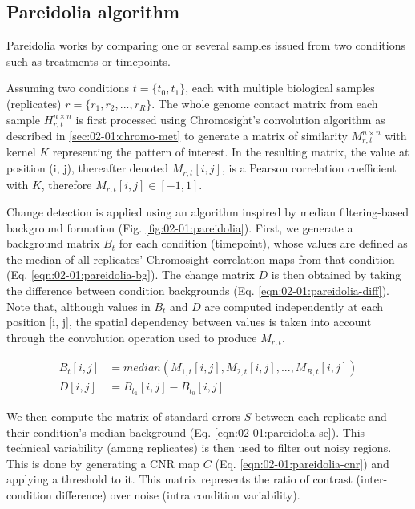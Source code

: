 \subsection{Pareidolia algorithm}

Pareidolia works by comparing one or several samples issued from two conditions such as treatments or timepoints.


Assuming two conditions $t=\{t_0, t_1\}$, each with multiple biological samples (replicates) $r=\{r_1, r_2, ..., r_R\}$. The whole genome contact matrix from each sample $H_{r, t}^{n \times n}$ is first processed using Chromosight's convolution algorithm as described in \ref{sec:02-01:chromo-met} to generate a matrix of similarity $M_{r, t}^{n \times n}$ with kernel $K$ representing the pattern of interest. In the resulting matrix, the value at position (i, j), thereafter denoted $M_{r, t}[i, j]$, is a Pearson correlation coefficient with $K$, therefore $M_{r,t}[i, j] \in [-1, 1]$.

Change detection is applied using an algorithm inspired by median filtering-based background formation \cite{ilseverTwoDimensionalChangeDetection2012} (Fig. \ref{fig:02-01:pareidolia}). First, we generate a background matrix $B_t$ for each condition (timepoint), whose values are defined as the median of all replicates' Chromosight correlation maps from that condition (Eq. \ref{eqn:02-01:pareidolia-bg}). The change matrix $D$ is then obtained by taking the difference between condition backgrounds (Eq. \ref{eqn:02-01:pareidolia-diff}). Note that, although values in $B_t$ and $D$ are computed independently at each position [i, j], the spatial dependency between values is taken into account through the convolution operation used to produce $M_{r, t}$.

\begin{align}
    \label{eqn:02-01:pareidolia-bg}
    B_t[i, j] &= median(M_{1, t}[i, j], M_{2, t}[i, j], ..., M_{R, t}[i, j]) \\
    \label{eqn:02-01:pareidolia-diff}
    D[i, j] &= B_{t_1}[i, j] - B_{t_0}[i, j]
\end{align}

We then compute the matrix of standard errors $S$ between each replicate and their condition's median background (Eq. \ref{eqn:02-01:pareidolia-se}). This technical variability (among replicates) is then used to filter out noisy regions. This is done by generating a \acrfull{CNR} map $C$ (Eq. \ref{eqn:02-01:pareidolia-cnr}) and applying a threshold to it. This matrix represents the ratio of contrast (inter-condition difference) over noise (intra condition variability).

